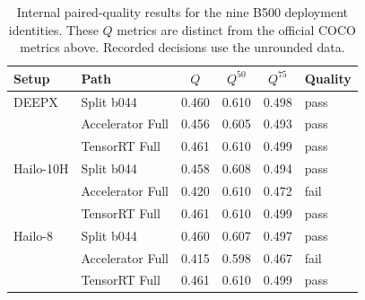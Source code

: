 \begin{table}[htbp]
\centering\small\TableSetup
\caption{Internal paired-quality results for the nine B500 deployment identities. These $Q$ metrics are distinct from the official COCO metrics above. Recorded decisions use the unrounded data.}
\label{tab:evaluation:yolov7_standard_quality}
\begin{tabularx}{\linewidth}{@{}L{1.55cm}Y S[table-format=1.3] S[table-format=1.3] S[table-format=1.3]l@{}}
\toprule
\textbf{Setup} & \textbf{Path} & {$Q$} & {$Q^{50}$} & {$Q^{75}$} & \textbf{Quality} \\
\midrule
DEEPX & Split b044 & 0.460 & 0.610 & 0.498 & pass \\
 & Accelerator Full & 0.456 & 0.605 & 0.493 & pass \\
 & TensorRT Full & 0.461 & 0.610 & 0.499 & pass \\
\addlinespace[.3em]
Hailo-10H & Split b044 & 0.458 & 0.608 & 0.494 & pass \\
 & Accelerator Full & 0.420 & 0.610 & 0.472 & fail \\
 & TensorRT Full & 0.461 & 0.610 & 0.499 & pass \\
\addlinespace[.3em]
Hailo-8 & Split b044 & 0.460 & 0.607 & 0.497 & pass \\
 & Accelerator Full & 0.415 & 0.598 & 0.467 & fail \\
 & TensorRT Full & 0.461 & 0.610 & 0.499 & pass \\
\bottomrule
\end{tabularx}
\end{table}
